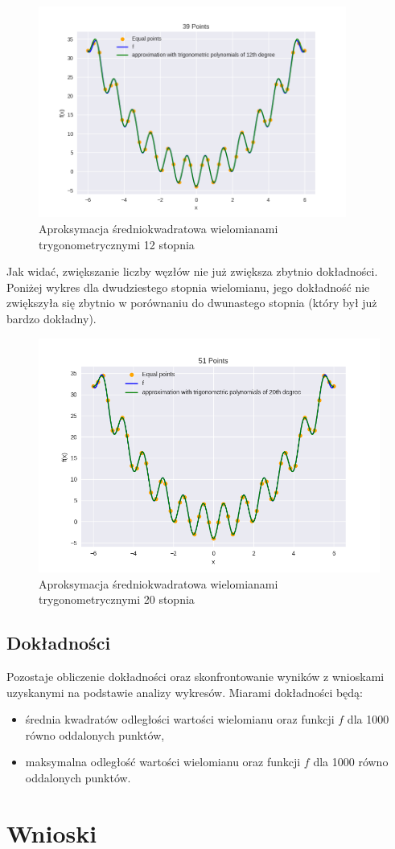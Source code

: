 \documentclass{article}
\begin{document}
\begin{figure}[H]
    \centering
    \includegraphics[width=0.9\textwidth]{img/tripoly_12_39.png}
    \caption{Aproksymacja średniokwadratowa wielomianami trygonometrycznymi 12 stopnia}
\end{figure}

Jak widać, zwiększanie liczby węzłów nie już zwiększa zbytnio dokładności. Poniżej wykres dla dwudziestego stopnia wielomianu,
jego dokładność nie zwiększyła się zbytnio w porównaniu do dwunastego stopnia (który był już bardzo dokładny).

\begin{figure}[H]
    \centering
    \includegraphics[width=\textwidth]{img/tripoly_20_51.png}
    \caption{Aproksymacja średniokwadratowa wielomianami trygonometrycznymi 20 stopnia}
\end{figure}

\subsection{Dokładności}
Pozostaje obliczenie dokładności oraz skonfrontowanie wyników z wnioskami uzyskanymi na podstawie analizy wykresów. Miarami dokładności będą:
\begin{itemize}
    \item
    średnia kwadratów odległości wartości wielomianu oraz funkcji $f$ dla 1000 równo oddalonych punktów,
    \item
    maksymalna odległość wartości wielomianu oraz funkcji $f$ dla 1000 równo oddalonych punktów.
\end{itemize}


\section{Wnioski}
\end{document}

